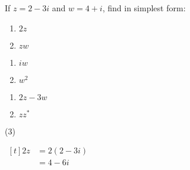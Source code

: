 \documentclass[11pt,a4paper]{book}
\begin{document}
\begin{example}

If $z=2-3i$ and $w=4+i$, find in simplest form:

\begin{minipage}[t]{0.33\textwidth}

\begin{enumerate}[label=(\alph*)]

\item  $2z$

\addtocounter{enumi}{2}

\item  $zw$

\end{enumerate}

\end{minipage}
\begin{minipage}[t]{0.33\textwidth}

\begin{enumerate}[label=(\alph*),start=2]

\item  $iw$

\addtocounter{enumi}{2}

\item  $w^{2}$

\end{enumerate}

\end{minipage}
\begin{minipage}[t]{0.33\textwidth}

\begin{enumerate}[label=(\alph*),start=3]

\item  $2z-3w$

\addtocounter{enumi}{2}

\item  $zz^{*}$

\end{enumerate}

\end{minipage}

\medskip{}

\Solution

\begin{tasks}[label=(\alph*), column-sep={1cm}](3)

\task
$
\begin{aligned}[t]
2z & =2\left(2-3i\right)\\
 & =4-6i
\end{aligned}
$



\end{tasks}
\end{example}
\end{document}
